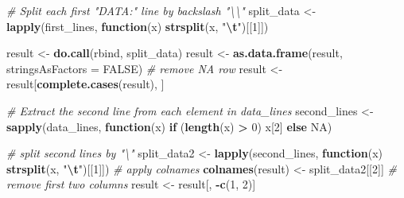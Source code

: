 \documentclass[
]{article}
\newenvironment{Shaded}{\begin{snugshade}}{\end{snugshade}}
\newcommand{\AttributeTok}[1]{\textcolor[rgb]{0.13,0.29,0.53}{#1}}
\newcommand{\CommentTok}[1]{\textcolor[rgb]{0.56,0.35,0.01}{\textit{#1}}}
\newcommand{\ConstantTok}[1]{\textcolor[rgb]{0.56,0.35,0.01}{#1}}
\newcommand{\ControlFlowTok}[1]{\textcolor[rgb]{0.13,0.29,0.53}{\textbf{#1}}}
\newcommand{\DecValTok}[1]{\textcolor[rgb]{0.00,0.00,0.81}{#1}}
\newcommand{\FunctionTok}[1]{\textcolor[rgb]{0.13,0.29,0.53}{\textbf{#1}}}
\newcommand{\NormalTok}[1]{#1}
\newcommand{\OtherTok}[1]{\textcolor[rgb]{0.56,0.35,0.01}{#1}}
\newcommand{\SpecialCharTok}[1]{\textcolor[rgb]{0.81,0.36,0.00}{\textbf{#1}}}
\newcommand{\StringTok}[1]{\textcolor[rgb]{0.31,0.60,0.02}{#1}}
\begin{document}
\begin{Shaded}
\begin{Highlighting}[]
\CommentTok{\# Split each first "DATA:" line by backslash "\textbackslash{}\textbackslash{}"}
\NormalTok{split\_data }\OtherTok{\textless{}{-}} \FunctionTok{lapply}\NormalTok{(first\_lines, }\ControlFlowTok{function}\NormalTok{(x) }\FunctionTok{strsplit}\NormalTok{(x, }\StringTok{"}\SpecialCharTok{\textbackslash{}t}\StringTok{"}\NormalTok{)[[}\DecValTok{1}\NormalTok{]])}

\NormalTok{result }\OtherTok{\textless{}{-}} \FunctionTok{do.call}\NormalTok{(rbind, split\_data)}
\NormalTok{result }\OtherTok{\textless{}{-}} \FunctionTok{as.data.frame}\NormalTok{(result, }\AttributeTok{stringsAsFactors =} \ConstantTok{FALSE}\NormalTok{)}
\CommentTok{\# remove NA row}
\NormalTok{result }\OtherTok{\textless{}{-}}\NormalTok{ result[}\FunctionTok{complete.cases}\NormalTok{(result), ]}




\CommentTok{\# Extract the second line from each element in data\_lines}
\NormalTok{second\_lines }\OtherTok{\textless{}{-}} \FunctionTok{sapply}\NormalTok{(data\_lines, }\ControlFlowTok{function}\NormalTok{(x) }\ControlFlowTok{if}\NormalTok{ (}\FunctionTok{length}\NormalTok{(x) }\SpecialCharTok{\textgreater{}} \DecValTok{0}\NormalTok{) x[}\DecValTok{2}\NormalTok{] }\ControlFlowTok{else} \ConstantTok{NA}\NormalTok{)}

\CommentTok{\# split second lines by "\textbackslash{}"}
\NormalTok{split\_data2 }\OtherTok{\textless{}{-}} \FunctionTok{lapply}\NormalTok{(second\_lines, }\ControlFlowTok{function}\NormalTok{(x) }\FunctionTok{strsplit}\NormalTok{(x, }\StringTok{"}\SpecialCharTok{\textbackslash{}t}\StringTok{"}\NormalTok{)[[}\DecValTok{1}\NormalTok{]])}
\CommentTok{\# apply colnames}
\FunctionTok{colnames}\NormalTok{(result) }\OtherTok{\textless{}{-}}\NormalTok{ split\_data2[[}\DecValTok{2}\NormalTok{]]}
\CommentTok{\# remove first two columns}
\NormalTok{result }\OtherTok{\textless{}{-}}\NormalTok{ result[, }\SpecialCharTok{{-}}\FunctionTok{c}\NormalTok{(}\DecValTok{1}\NormalTok{, }\DecValTok{2}\NormalTok{)]}


\end{Highlighting}
\end{Shaded}
\end{document}
